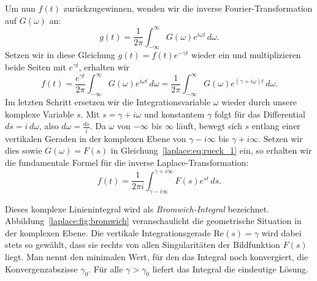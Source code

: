 Um nun $f(t)$ zurückzugewinnen, wenden wir die inverse Fourier-Transformation auf $G(\omega)$ an:
\begin{equation}
    g(t) = \frac{1}{2\pi} \int_{-\infty}^{\infty} G(\omega) e^{i\omega t} \, d\omega.
    \label{laplace:eq:inv_fourier_g}
\end{equation}
Setzen wir in diese Gleichung $g(t) = f(t) e^{-\gamma t}$ wieder ein und multiplizieren beide Seiten mit $e^{\gamma t}$, erhalten wir
\begin{equation}
    f(t) = \frac{e^{\gamma t}}{2\pi} \int_{-\infty}^{\infty} G(\omega) e^{i\omega t} \, d\omega 
         = \frac{1}{2\pi} \int_{-\infty}^{\infty} G(\omega) e^{(\gamma + i\omega)t} \, d\omega.
    \label{laplace:eq:rueck_1}
\end{equation}
Im letzten Schritt ersetzen wir die Integrationsvariable $\omega$ wieder durch unsere komplexe Variable $s$.
Mit $s = \gamma + i\omega$ und konstantem $\gamma$ folgt für das Differential $ds = i \, d\omega$, also $d\omega = \frac{ds}{i}$.
Da $\omega$ von $-\infty$ bis $\infty$ läuft, bewegt sich $s$ entlang einer vertikalen Geraden in der komplexen Ebene von $\gamma - i\infty$ bis $\gamma + i\infty$.
Setzen wir dies sowie $G(\omega) = F(s)$ in Gleichung~\eqref{laplace:eq:rueck_1} ein, so erhalten wir die fundamentale Formel für die inverse Laplace-Transformation:
\begin{equation}
    f(t) = \frac{1}{2\pi i} \int_{\gamma - i\infty}^{\gamma + i\infty} F(s) e^{st} \, ds.
    \label{laplace:eq:bromwich_integral}
\end{equation}

Dieses komplexe Linienintegral wird als \emph{Bromwich-Integral} bezeichnet.
%
Abbildung~\ref{laplace:fig:bromwich} veranschaulicht die geometrische Situation in der komplexen Ebene.
Die vertikale Integrationsgerade $\text{Re}(s) = \gamma$ wird dabei stets so gewählt, dass sie rechts von allen Singularitäten der Bildfunktion $F(s)$ liegt.
%
Man nennt den minimalen Wert, für den das Integral noch konvergiert, die Konvergenzabszisse $\gamma_0$.
Für alle $\gamma > \gamma_0$ liefert das Integral die eindeutige Lösung.


